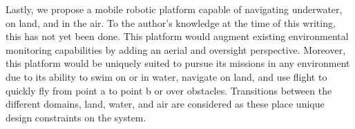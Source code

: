 Lastly, we propose a mobile robotic platform capable of navigating underwater, on land, and in the air. To the author's knowledge at the time of this writing, this has not yet been done. This platform would augment existing environmental monitoring capabilities by adding an aerial and oversight perspective. Moreover, this platform would be uniquely suited to pursue its missions in any environment due to its ability to swim on or in water, navigate on land, and use flight to quickly fly from point a to point b or over obstacles. Transitions between the different domains, land, water, and air are considered as these place unique design constraints on the system. 













